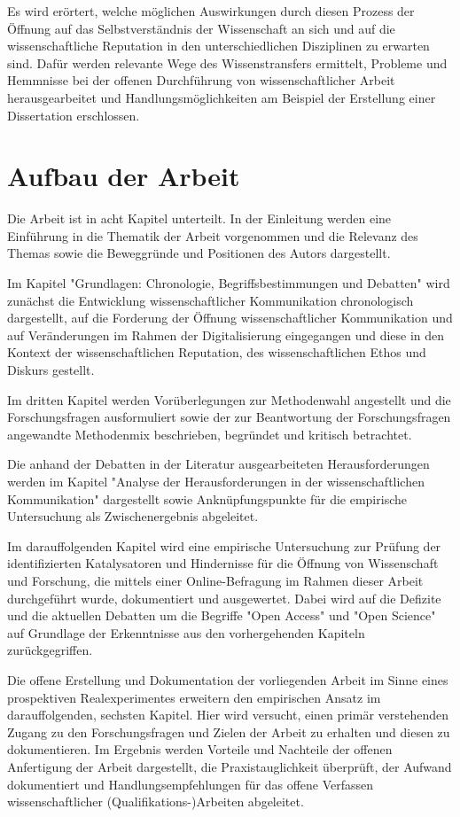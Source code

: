 Es wird erörtert, welche möglichen Auswirkungen durch diesen Prozess der Öffnung auf das Selbstverständnis der Wissenschaft an sich und auf die wissenschaftliche Reputation in den unterschiedlichen Disziplinen zu erwarten sind. Dafür werden relevante Wege des Wissenstransfers ermittelt, Probleme und Hemmnisse bei der offenen Durchführung von wissenschaftlicher Arbeit herausgearbeitet und Handlungsmöglichkeiten am Beispiel der Erstellung einer Dissertation erschlossen.

\section{Aufbau der Arbeit}

Die Arbeit ist in acht Kapitel unterteilt. In der Einleitung werden eine Einführung in die Thematik der Arbeit vorgenommen und die Relevanz des Themas sowie die Beweggründe und Positionen des Autors dargestellt.

Im Kapitel "Grundlagen: Chronologie, Begriffsbestimmungen und Debatten" wird zunächst die Entwicklung wissenschaftlicher Kommunikation chronologisch dargestellt, auf die Forderung der Öffnung wissenschaftlicher Kommunikation und auf Veränderungen im Rahmen der Digitalisierung eingegangen und diese in den Kontext der wissenschaftlichen Reputation, des wissenschaftlichen Ethos und Diskurs gestellt.

Im dritten Kapitel werden Vorüberlegungen zur Methodenwahl angestellt und die Forschungsfragen ausformuliert sowie der zur Beantwortung der Forschungsfragen angewandte Methodenmix beschrieben, begründet und kritisch betrachtet.

Die anhand der Debatten in der Literatur ausgearbeiteten Herausforderungen werden im Kapitel "Analyse der Herausforderungen in der wissenschaftlichen Kommunikation" dargestellt sowie Anknüpfungspunkte für die empirische Untersuchung als Zwischenergebnis abgeleitet.

Im darauffolgenden Kapitel wird eine empirische Untersuchung zur Prüfung der identifizierten Katalysatoren und Hindernisse für die Öffnung von Wissenschaft und Forschung, die mittels einer Online-Befragung im Rahmen dieser Arbeit durchgeführt wurde, dokumentiert und ausgewertet. Dabei wird auf die Defizite und die aktuellen Debatten um die Begriffe "Open Access" und "Open Science" auf Grundlage der Erkenntnisse aus den vorhergehenden Kapiteln zurückgegriffen.

Die offene Erstellung und Dokumentation der vorliegenden Arbeit im Sinne eines prospektiven Realexperimentes erweitern den empirischen Ansatz im darauffolgenden, sechsten Kapitel. Hier wird versucht, einen primär verstehenden Zugang zu den Forschungsfragen und Zielen der Arbeit zu erhalten und diesen zu dokumentieren. Im Ergebnis werden Vorteile und Nachteile der offenen Anfertigung der Arbeit dargestellt, die Praxistauglichkeit überprüft, der Aufwand dokumentiert und Handlungsempfehlungen für das offene Verfassen wissenschaftlicher (Qualifikations-)Arbeiten abgeleitet.

